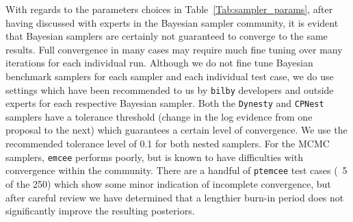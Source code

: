 %
%
With regards to the parameters choices in Table~\ref{Tab:sampler_params}, 
after having discussed with experts in the Bayesian sampler community, 
it is evident that Bayesian samplers are certainly not guaranteed 
to converge to the same results. Full convergence in many cases may 
require much fine tuning over many iterations for each individual run. 
Although we do not fine tune Bayesian benchmark samplers for each 
sampler and each individual test case, we do use settings which 
have been recommended to us by \texttt{bilby} developers and outside experts 
for each respective Bayesian sampler. Both the \texttt{Dynesty} and 
\texttt{CPNest} 
samplers have a tolerance threshold (change in the log evidence 
from one proposal to the next) which guarantees a certain level of 
convergence. We use the recommended tolerance level of 0.1 for 
both nested samplers. For the \ac{MCMC} samplers, \texttt{emcee} 
performs poorly, 
but is known to have difficulties with convergence within the 
community. There are a handful of \texttt{ptemcee} test cases 
(~5 of the 250) which show some minor indication of incomplete 
convergence, but after careful review we have determined that a 
lengthier burn-in period does not significantly improve the 
resulting posteriors.


